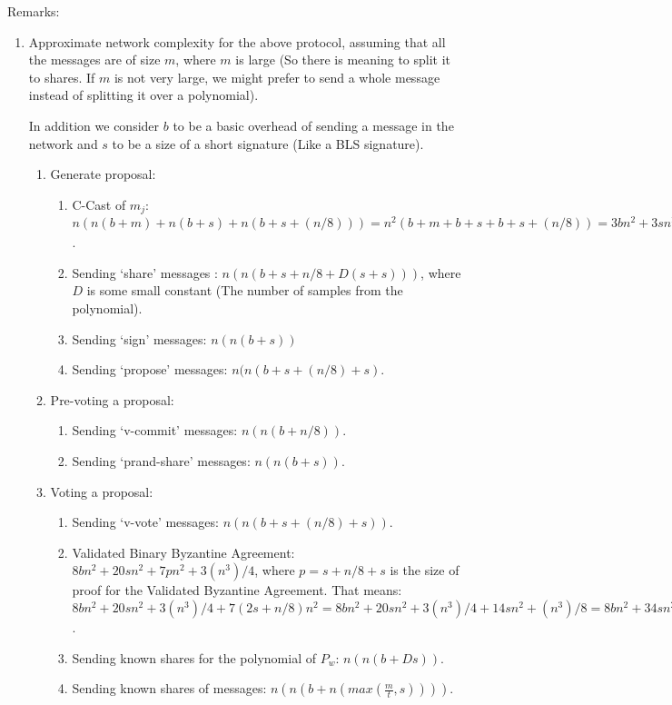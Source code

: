 Remarks:
\begin{enumerate}
  \item Approximate network complexity for the above protocol, assuming that all
    the messages are of size $m$, where $m$ is large (So there is meaning to
    split it to shares. If $m$ is not very large, we might prefer to send a
    whole message instead of splitting it over a polynomial).

    In addition we consider $b$ to be a basic overhead of sending a message in
    the network and $s$ to be a size of a short signature (Like a BLS
    signature).
  \begin{enumerate}
    \item Generate proposal: 
    \begin{enumerate}
      \item C-Cast of $m_j$: $n(n(b + m) + n(b + s) + n(b + s + (n/8))) =
        {n^2}(b + m + b + s + b + s + (n/8)) = 3bn^2 + 3sn^2 + mn^2 +
        (n^3)/8$.
      \item Sending `share' messages : $n(n(b + s + n/8 + D(s + s)))$, where $D$
        is some small constant (The number of samples from the polynomial).
      \item Sending `sign' messages: $n(n(b + s))$
      \item Sending `propose' messages: $n(n(b + s + (n/8) + s)$.
    \end{enumerate}
    \item Pre-voting a proposal:
    \begin{enumerate}
      \item Sending `v-commit' messages: $n(n(b + n/8))$.
      \item Sending `prand-share' messages: $n(n(b + s))$.
    \end{enumerate}
    \item Voting a proposal:
    \begin{enumerate}
      \item Sending `v-vote' messages: $n(n(b + s + (n/8) + s))$.
      \item Validated Binary Byzantine Agreement: $8bn^2 + 20sn^2 + 7pn^2 +
        3(n^3)/4$, where $p = s + n/8 + s$ is the size of proof for the
        Validated Byzantine Agreement. That means: $8bn^2 + 20sn^2 + 3(n^3)/4 +
        7(2s + n/8)n^2 = 8bn^2 + 20sn^2 + 3(n^3)/4 + 14sn^2 + (n^3)/8 = 8bn^2 +
        34sn^2 + (7/8)(n^3)$.
      \item Sending known shares for the polynomial of $P_w$: $n(n(b + Ds))$.
      \item Sending known shares of messages: $n(n(b + n(max(\frac{m}{t},s))))$.

\end{enumerate}
\end{enumerate}
\end{enumerate}
